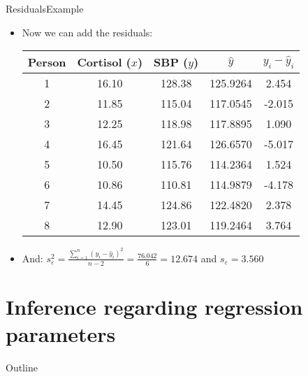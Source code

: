 \documentclass[xcolor=dvipsnames]{beamer}
\begin{document}
\begin{frame}{Residuals}{Example}
	\begin{itemize}
		\item Now we can add the residuals:
		\vspace{1mm}
		\begin{center}
			\begin{tabular}{ccccc}
				\hline
				Person& Cortisol ($x$) & SBP ($y$)  & $\hat{y}$ & $y_i - \hat{y}_i$ \\ 
				\hline
				1 & 16.10 & 128.38  & 125.9264 & 2.454\\ 
				2 & 11.85 & 115.04  & 117.0545 & -2.015\\ 
				3 & 12.25 & 118.98  & 117.8895 & 1.090\\ 
				4 & 16.45 & 121.64  & 126.6570 & -5.017\\ 
				5 & 10.50 & 115.76  & 114.2364 & 1.524\\ 
				6 & 10.86 & 110.81  & 114.9879 & -4.178\\ 
				7 & 14.45 & 124.86  & 122.4820 & 2.378\\ 
				8 & 12.90 & 123.01  & 119.2464 &  3.764\\ 
				\hline
			\end{tabular}
		\end{center}
	\vspace{1mm}
	\item And: 	$s^2_{\varepsilon} = \frac{\sum_{i=1}^{n}\left(y_i - \hat{y}_i\right)^2}{n-2} = \frac{76.042}{6} = 12.674$ and $s_{\varepsilon}=3.560$
	\end{itemize}
\end{frame}

\section{Inference regarding regression parameters}
\begin{frame}{Outline}
\tableofcontents[currentsection,subsectionstyle=show/shaded/hide]
\end{frame}
\end{document}
